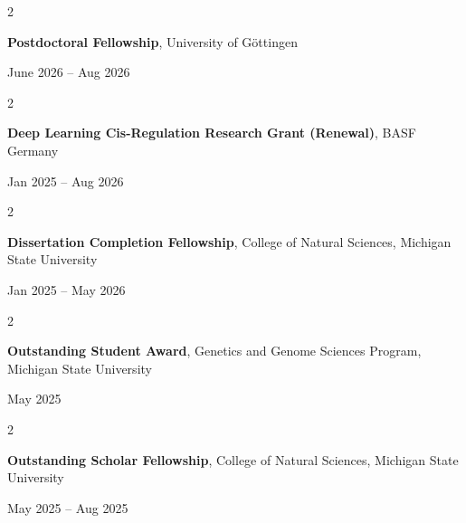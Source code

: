 \documentclass[10pt, letterpaper]{article}
\newenvironment{twocolentry}[2][]{
    \onecolentry
    \def\secondColumn{#2}
    \setcolumnwidth{\fill, 4.5 cm}
    \begin{paracol}{2}
}{
    \switchcolumn \raggedleft \secondColumn
    \end{paracol}
    \endonecolentry
} %
\begin{document}
        \begin{samepage} 
            \begin{twocolentry}{
                June 2026 – Aug 2026
                }
                \textbf{Postdoctoral Fellowship}, University of Göttingen
            \end{twocolentry}
        \end{samepage}  


        \vspace{0.2 cm}
        
        \begin{samepage} 
            \begin{twocolentry}{
                Jan 2025 – Aug 2026
                }
                \textbf{Deep Learning Cis-Regulation Research Grant (Renewal)}, BASF Germany
            \end{twocolentry}
        \end{samepage}  


        \vspace{0.2 cm}
        

        \begin{samepage} 
            \begin{twocolentry}{
                Jan 2025 – May 2026
                }
                \textbf{Dissertation Completion Fellowship}, College of Natural Sciences, Michigan State University
            \end{twocolentry}
        \end{samepage}  


        \vspace{0.2 cm}


         \begin{samepage} 
            \begin{twocolentry}{
                May 2025
                }
                \textbf{Outstanding Student Award}, Genetics and Genome Sciences Program, Michigan State University
            \end{twocolentry}
        \end{samepage}  


        \vspace{0.2 cm}

        
        \begin{samepage} 
            \begin{twocolentry}{
                May 2025 – Aug 2025
                }
                \textbf{Outstanding Scholar Fellowship}, College of Natural Sciences, Michigan State University
            \end{twocolentry}
        \end{samepage}  
\end{document}
